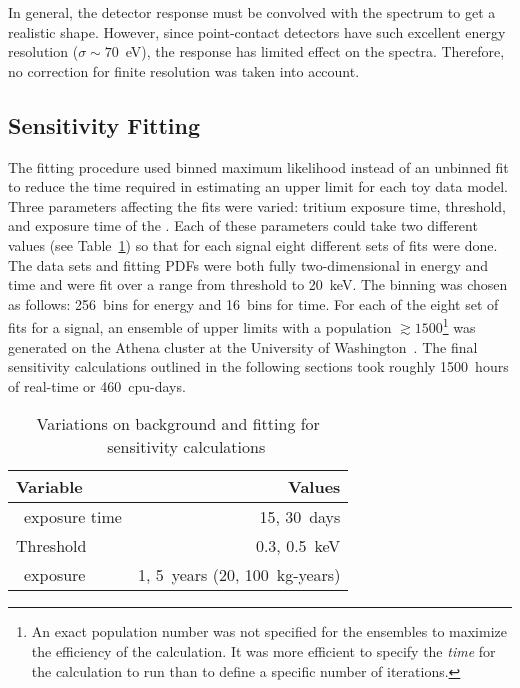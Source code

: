 	In general, the detector response must be convolved with the spectrum to get a realistic shape.  However, since point-contact detectors have such excellent energy resolution ($\sigma\sim70$~eV), the response has limited effect on the spectra.  Therefore, no correction for finite resolution was taken into account.  

		\subsection{Sensitivity Fitting}
		\label{sec:MJSensitivityFitting}
	
	The fitting procedure used binned maximum likelihood instead of an unbinned fit to reduce the time required in estimating an upper limit for each toy data model.  Three parameters affecting the fits were varied: tritium exposure time, threshold, and exposure time of the \minmod.  Each of these parameters could take two different values (see Table~\ref{tab:SensFitValues}) so that for each signal eight different sets of fits were done.  The data sets and fitting PDFs were both fully two-dimensional in energy and time and were fit over a range from threshold to 20~keV.  The binning was chosen as follows: 256~bins for energy and 16~bins for time.  For each of the eight set of fits for a signal, an ensemble of upper limits with a population $\gtrsim1500$\footnote{ An exact population number was not specified for the ensembles to maximize the efficiency of the calculation.  It was more efficient to specify the \emph{time} for the calculation to run than to define a specific number of iterations.} was generated on the Athena cluster at the University of Washington~\cite{Athena}.  The final sensitivity calculations outlined in the following sections took roughly 1500~hours of real-time or 460~cpu-days.
	
			\begin{table}
				\centering
				\begin{tabular}{l r}
					\toprule
					Variable & Values \\
					\midrule
					\hthree~exposure time & 15, 30~days \\
					Threshold & 0.3, 0.5~keV \\
					\minmod~exposure & 1, 5~years (20, 100~kg-years) \\
					\bottomrule 
				\end{tabular}				
				\caption[Variations on background and fitting for \MJ~\minmod~sensitivity calculations]
				{Variations on background and fitting for \MJ~\minmod~sensitivity calculations}
				\label{tab:SensFitValues}
			\end{table}		
		
